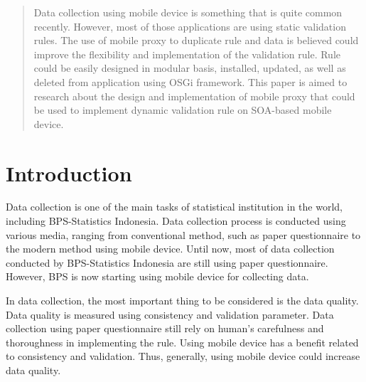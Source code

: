 \documentclass[conference]{IEEEtran}
\begin{document}




\maketitle

\begin{abstract}
Data collection using mobile device is something that is quite common recently. However, most of those applications are using static validation rules. The use of mobile proxy to duplicate rule and data is believed could improve the flexibility and implementation of the validation rule. Rule could be easily designed in modular basis, installed, updated, as well as deleted from application using OSGi framework. This paper is aimed to research about the design and implementation of mobile proxy that could be used to implement dynamic validation rule on SOA-based mobile device.
\end{abstract}





%
\IEEEpeerreviewmaketitle




\section{Introduction}
Data collection is one of the main tasks of statistical institution in the world, including BPS-Statistics Indonesia. Data collection process is conducted using various media, ranging from conventional method, such as paper questionnaire to the modern method using mobile device. Until now, most of data collection conducted by BPS-Statistics Indonesia are still using paper questionnaire. However, BPS is now starting using mobile device for collecting data.

In data collection, the most important thing to be considered is the data quality. Data quality is measured using consistency and validation parameter. Data collection using paper questionnaire still rely on human’s carefulness and thoroughness in implementing the rule. Using mobile device has a benefit related to consistency and validation. Thus, generally, using mobile device could increase data quality.
\end{document}
